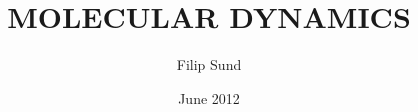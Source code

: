 \documentclass[twoside,english]{uiofysmaster}
\author{Filip Sund}
\title{\uppercase{Molecular Dynamics}}
\date{June 2012}
\begin{document}
\begin{titlepage}
\maketitle
\end{titlepage}
\end{document}
